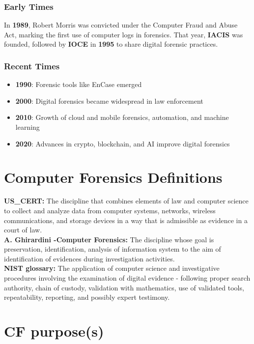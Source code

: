\subsubsection{Early Times}
In \textbf{1989}, Robert Morris was convicted under the Computer Fraud and 
Abuse Act, marking the first use of computer logs in forensics. That year, 
\textbf{IACIS} was founded, followed by \textbf{IOCE} in \textbf{1995} to 
share digital forensic practices.

\subsubsection{Recent Times}
\begin{itemize}
    \item \textbf{1990}: Forensic tools like EnCase emerged
    \item \textbf{2000}: Digital forensics became widespread in law enforcement
    \item \textbf{2010}: Growth of cloud and mobile forensics, automation, and 
    machine learning
    \item \textbf{2020}: Advances in crypto, blockchain, and AI improve digital 
    forensics
\end{itemize}

\section{Computer Forensics Definitions}

\textbf{US\_CERT:} The discipline that combines elements of law and computer 
science to collect and analyze data from computer systems, 
networks, wireless communications, and storage devices in a 
way that is admissible as evidence in a court of law. \\
\textbf{A. Ghirardini -Computer Forensics:} The discipline whose goal is preservation, identification, analysis of 
information system to the aim of identification of evidences during 
investigation activities. \\
\textbf{NIST glossary:} The application of computer science and investigative procedures 
involving the examination of digital evidence - following proper search 
authority, chain of custody, validation with mathematics, use of validated 
tools, repeatability, reporting, and possibly expert testimony.

\section{CF purpose(s)}

